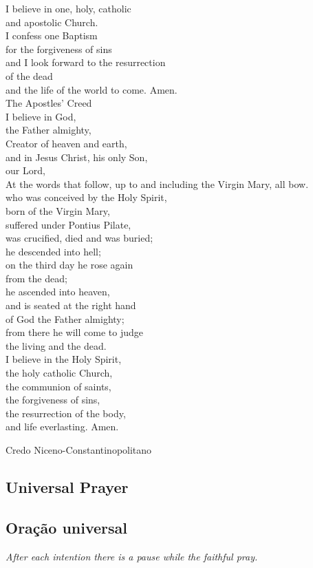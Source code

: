 \documentclass[10pt,a5]{article}
\newcommand \subsect[2] {\subsection*{#1} \switchcolumn \subsection*{#2} \switchcolumn*}
\begin{document}
\begin{paracol}{2}
\noindent
I believe in one, holy, catholic\\
and apostolic Church.\\
I confess one Baptism\\
for the forgiveness of sins\\
and I look forward to the resurrection\\
of the dead\\
and the life of the world to come. Amen.\\
The Apostles’ Creed\\
I believe in God,\\
the Father almighty,\\
Creator of heaven and earth,\\
and in Jesus Christ, his only Son,\\
our Lord,\\
{\tiny At the words that follow, up to and including the Virgin Mary, all bow.}\\
who was conceived by the Holy Spirit,\\
born of the Virgin Mary,\\
suffered under Pontius Pilate,\\
was crucified, died and was buried;\\
he descended into hell;\\
on the third day he rose again\\
from the dead;\\
he ascended into heaven,\\
and is seated at the right hand\\
of God the Father almighty;\\
from there he will come to judge\\
the living and the dead.\\
I believe in the Holy Spirit,\\
the holy catholic Church,\\
the communion of saints,\\
the forgiveness of sins,\\
the resurrection of the body,\\
and life everlasting. Amen.

\switchcolumn

Credo Niceno-Constantinopolitano

\switchcolumn*

\subsect{Universal Prayer}{Ora\c{c}\~{a}o universal}
\small\textit{After each intention there is a pause while the faithful pray.}


\end{paracol}
\end{document}
